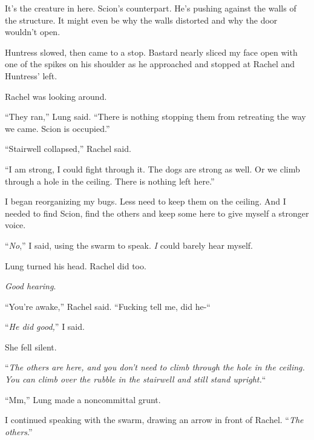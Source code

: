 It's the creature in here.  Scion's counterpart.  He's pushing against the walls of the structure.  It might even be why the walls distorted and why the door wouldn't open.



Huntress slowed, then came to a stop.  Bastard nearly sliced my face open with one of the spikes on his shoulder as he approached and stopped at Rachel and Huntress' left.



Rachel was looking around.



``They ran,'' Lung said.  ``There is nothing stopping them from retreating the way we came.  Scion is occupied.''



``Stairwell collapsed,'' Rachel said.



``I am strong, I could fight through it.  The dogs are strong as well.  Or we climb through a hole in the ceiling.  There is nothing left here.''



I began reorganizing my bugs.  Less need to keep them on the ceiling.  And I needed to find Scion, find the others and keep some here to give myself a stronger voice.



``\emph{No},'' I said, using the swarm to speak.  \emph{I} could barely hear myself.



Lung turned his head.  Rachel did too.



\emph{Good hearing}.



``You're awake,'' Rachel said.  ``Fucking tell me, did he-``



``\emph{He did good,}'' I said.



She fell silent.



``\emph{The others are here, and you don't need to climb through the hole in the ceiling.  You can climb over the rubble in the stairwell and still stand upright.}``



``Mm,'' Lung made a noncommittal grunt.



I continued speaking with the swarm, drawing an arrow in front of Rachel.  ``\emph{The others}.''



